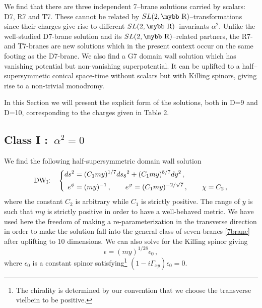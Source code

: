 \documentclass[12pt,a4paper]{article}
\def\bb#1{\hbox{\mybb#1}}
\begin{document}
We find that there are three independent 7--brane solutions
carried by scalars: D7, R7 and T7. These cannot be related by
$SL(2,\bb{R})$--transformations since their charges give rise to
different $SL(2,\bb{R})$--invariants $\alpha^2$. Unlike the
well-studied D7-brane solution and its $SL(2,\bb{R})$--related
partners, the R7- and T7-branes are new solutions which in the
present context occur on the same footing as the D7-brane. We also
find a G7 domain wall solution which has vanishing potential but
non-vanishing superpotential. It can be uplifted to a half--supersymmetic
conical space-time without scalars but with Killing
spinors, giving rise to a non-trivial monodromy.

In this Section we will present the explicit form of the solutions, both in D=9
and D=10, corresponding to the charges given in Table 2.

\subsection{Class I :\ $\alpha^2 = 0$}

We find the following half-supersymmetric domain wall solution
\begin{equation}
  \text{DW$_{\text{I}}$:~~~}\left\{\begin{aligned}
  ds^2 & = (C_1 m y)^{1/7}ds_8{}^2 + (C_1 m y)^{8/7}dy^2 \,,
\hskip 1.5truecm\\
  e^\phi & = (m y)^{-1}\,, \qquad
  e^\varphi = (C_1 m y)^{-2/\sqrt{7}} \,, \qquad
  \chi=C_2 \,,
\end{aligned}\right.
\label{D7in9gen}
\end{equation}
where the constant $C_2$ is arbitrary while $C_1$ is strictly positive.
The range of $y$ is such
that $m y$ is strictly positive in order to have a well-behaved metric.
We have used here the freedom of making a
re-parameterization in the transverse direction in order to make
the solution fall into the general class of seven-branes
\eqref{7brane} after uplifting to 10 dimensions.
We can also solve for the Killing spinor giving
\begin{equation}
\epsilon=(m y)^{1/28}\epsilon_0\, ,
\end{equation}
where $\epsilon_0$ is a constant spinor satisfying\footnote{The
chirality is determined by our convention that we choose the
transverse vielbein to be positive.}
$(1-i\Gamma_{\underline{xy}})\epsilon_0=0$.
\end{document}
